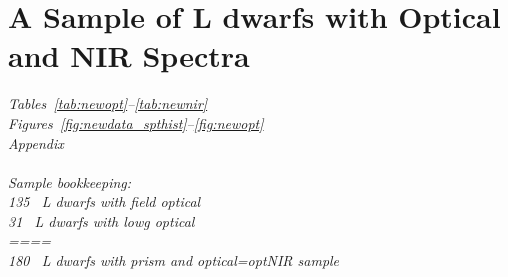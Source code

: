 \documentclass[12pt,preprint]{aastex}
\newcommand{\sample}{180}
\newcommand{\optNormal}{135}
\newcommand{\optLowG}{31}
\newcommand{\optNoisy}{13}
\newcommand{\optPec}{35}
\begin{document}
% 

\clearpage
\section{A Sample of L dwarfs with Optical and NIR Spectra}
\label{sec:sample}

\emph{
Tables~\ref{tab:newopt}--\ref{tab:newnir}\\
Figures~\ref{fig:newdata_spthist}--\ref{fig:newopt}\\
Appendix\\
\\
Sample bookkeeping:\\
\optNormal~ L dwarfs with field optical\\
\optLowG~ L dwarfs with lowg optical\\
====\\
\sample~ L dwarfs with prism and optical=optNIR sample\\
}
\end{document}
